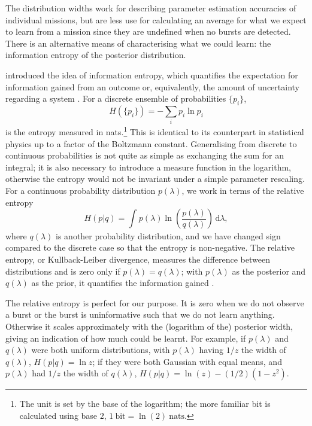 \documentclass[useAMS,usedcolumn,usegraphicx,usenatbib]{mn2e}
\newcommand{\units}[1]{\ensuremath{~\mathrm{#1}}}
\newcommand{\dd}{\ensuremath{\mathrm{d}}}
\newcommand{\intd}[4]{\ensuremath{\displaystyle \int_{#1}^{#2}{#3}\,\dd{#4}}}
\begin{document}
The distribution widths work for describing parameter estimation accuracies of individual missions, but are less use for calculating an average for what we expect to learn from a mission since they are undefined when no bursts are detected. There is an alternative means of characterising what we could learn: the information entropy of the posterior distribution.

\citet{Shannon1948,Shannon1948a} introduced the idea of information entropy, which quantifies the expectation for information gained from an outcome or, equivalently, the amount of uncertainty regarding a system \citep[chapters 2 and 4]{MacKay2003}. For a discrete ensemble of probabilities $\{p_i\}$,
\begin{equation}
H(\{p_i\}) = -\sum_i p_i \ln p_i
\end{equation}
is the entropy measured in nats.\footnote{The unit is set by the base of the logarithm; the more familiar bit is calculated using base $2$, $1\units{bit} = \ln(2)\units{nats}$.} This is identical to its counterpart in statistical physics up to a factor of the Boltzmann constant. Generalising from discrete to continuous probabilities is not quite as simple as exchanging the sum for an integral; it is also necessary to introduce a measure function in the logarithm, otherwise the entropy would not be invariant under a simple parameter rescaling. For a continuous probability distribution $p(\lambda)$, we work in terms of the relative entropy \citep[section 1.4]{Ihara1993}
\begin{equation}
H(p|q) = \intd{}{}{p(\lambda)\ln\left(\frac{p(\lambda)}{q(\lambda)}\right)}{\lambda},
\end{equation}
where $q(\lambda)$ is another probability distribution, and we have changed sign compared to the discrete case so that the entropy is non-negative. The relative entropy, or Kullback-Leiber divergence, measures the difference between distributions and is zero only if $p(\lambda) = q(\lambda)$; with $p(\lambda)$ as the posterior and $q(\lambda)$ as the prior, it quantifies the information gained \citep{Kullback1951}.

The relative entropy is perfect for our purpose. It is zero when we do not observe a burst or the burst is uninformative such that we do not learn anything. Otherwise it scales approximately with the (logarithm of the) posterior width, giving an indication of how much could be learnt. For example, if $p(\lambda)$ and $q(\lambda)$ were both uniform distributions, with $p(\lambda)$ having $1/z$ the width of $q(\lambda)$, $H(p|q) = \ln z$; if they were both Gaussian with equal means, and $p(\lambda)$ had $1/z$ the width of $q(\lambda)$, $H(p|q) = \ln(z) - (1/2)(1 - z^2)$.
\end{document}
